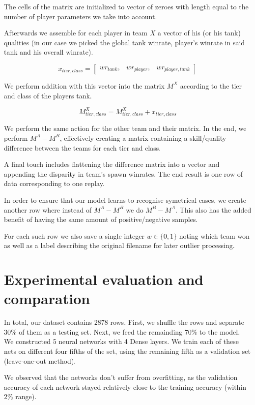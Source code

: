 \documentclass{report}
\begin{document}
The cells of the matrix are initialized to vector of zeroes with length equal to the number of player parameters we take into account.

Afterwards we assemble for each player in team $X$ a vector of his (or his tank) qualities (in our case we picked the global tank winrate, player's winrate in said tank and his overall winrate).

\[ x_{tier, class} = 
\begin{bmatrix}
	wr_{tank}, & wr_{player}, & wr_{player,tank}
\end{bmatrix}
\]

We perform addition with this vector into the matrix $M^X$ according to the tier and class of the players tank.

$$M^X_{tier, class} = M^X_{tier, class} + x_{tier, class}$$

We perform the same action for the other team and their matrix.
In the end, we perform $M^A - M^B$, effectively creating a matrix containing a skill/quality difference between the teams for each tier and class.

A final touch includes flattening the difference matrix into a vector and appending the disparity in team's spawn winrates.
The end result is one row of data corresponding to one replay.

In order to ensure that our model learns to recognise symetrical cases, we create another row where instead of $M^A - M^B$ we do $M^B - M^A$. This also has the added benefit of having the same amount of positive/negative samples.

For each such row we also save a single integer $w \in \{0, 1\}$ noting which team won as well as a label describing the original filename for later outlier processing.

\section{Experimental evaluation and comparation}

In total, our dataset contains 2878 rows.
First, we shuffle the rows and separate $30\%$ of them as a testing set.
Next, we feed the remainding $70\%$ to the model.
We constructed 5 neural networks with 4 Dense layers. We train each of these nets on different four fifths of the set, using the remaining fifth as a validation set (leave-one-out method).

We observed that the networks don't suffer from overfitting, as the validation accuracy of each network stayed relatively close to the training accuracy (within $2\%$ range).
\end{document}
